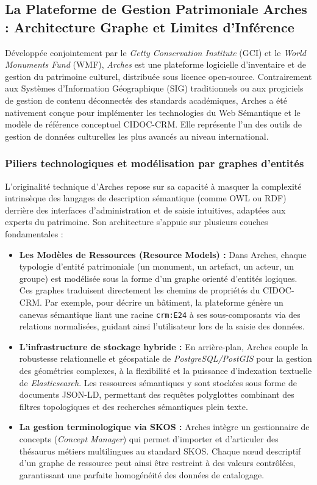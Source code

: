 \documentclass{article}
\begin{document}
\subsection{La Plateforme de Gestion Patrimoniale Arches : Architecture Graphe et Limites d'Inférence}
\label{subsec:arches_platform_approfondi}

Développée conjointement par le \textit{Getty Conservation Institute} (GCI) et le \textit{World Monuments Fund} (WMF), \textit{Arches} est une plateforme logicielle d'inventaire et de gestion du patrimoine culturel, distribuée sous licence open-source. Contrairement aux Systèmes d'Information Géographique (SIG) traditionnels ou aux progiciels de gestion de contenu déconnectés des standards académiques, Arches a été nativement conçue pour implémenter les technologies du Web Sémantique et le modèle de référence conceptuel CIDOC-CRM. Elle représente l'un des outils de gestion de données culturelles les plus avancés au niveau international.

\subsubsection{Piliers technologiques et modélisation par graphes d'entités}

L'originalité technique d'Arches repose sur sa capacité à masquer la complexité intrinsèque des langages de description sémantique (comme OWL ou RDF) derrière des interfaces d'administration et de saisie intuitives, adaptées aux experts du patrimoine. Son architecture s'appuie sur plusieurs couches fondamentales :

\begin{itemize}
    \item \textbf{Les Modèles de Ressources (Resource Models) :} Dans Arches, chaque typologie d'entité patrimoniale (un monument, un artefact, un acteur, un groupe) est modélisée sous la forme d'un graphe orienté d'entités logiques. Ces graphes traduisent directement les chemins de propriétés du CIDOC-CRM. Par exemple, pour décrire un bâtiment, la plateforme génère un canevas sémantique liant une racine \texttt{crm:E24} à ses sous-composants via des relations normalisées, guidant ainsi l'utilisateur lors de la saisie des données.
    \item \textbf{L'infrastructure de stockage hybride :} En arrière-plan, Arches couple la robustesse relationnelle et géospatiale de \textit{PostgreSQL/PostGIS} pour la gestion des géométries complexes, à la flexibilité et la puissance d'indexation textuelle de \textit{Elasticsearch}. Les ressources sémantiques y sont stockées sous forme de documents JSON-LD, permettant des requêtes polyglottes combinant des filtres topologiques et des recherches sémantiques plein texte.
    \item \textbf{La gestion terminologique via SKOS :} Arches intègre un gestionnaire de concepts (\textit{Concept Manager}) qui permet d'importer et d'articuler des thésaurus métiers multilingues au standard SKOS. Chaque nœud descriptif d'un graphe de ressource peut ainsi être restreint à des valeurs contrôlées, garantissant une parfaite homogénéité des données de catalogage.
\end{itemize}
\end{document}
